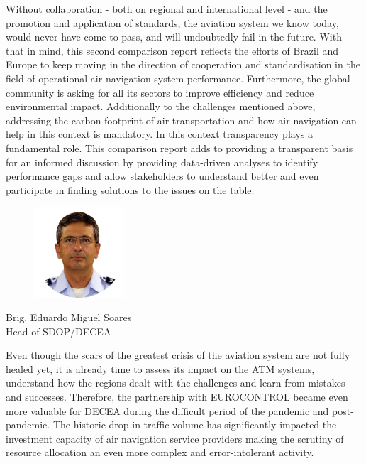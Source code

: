 \documentclass[
  a4paper,
  DIV=11,
  numbers=noendperiod]{scrreprt}
\begin{document}
Without collaboration - both on regional and international level - and
the promotion and application of standards, the aviation system we know
today, would never have come to pass, and will undoubtedly fail in the
future. With that in mind, this second comparison report reflects the
efforts of Brazil and Europe to keep moving in the direction of
cooperation and standardisation in the field of operational air
navigation system performance. Furthermore, the global community is
asking for all its sectors to improve efficiency and reduce
environmental impact. Additionally to the challenges mentioned above,
addressing the carbon footprint of air transportation and how air
navigation can help in this context is mandatory. In this context
transparency plays a fundamental role. This comparison report adds to
providing a transparent basis for an informed discussion by providing
data-driven analyses to identify performance gaps and allow stakeholders
to understand better and even participate in finding solutions to the
issues on the table.

\begin{figure}[h]

{\centering \includegraphics[width=0.3\textwidth,height=\textheight]{././figures/Brig_Ar_Miguel-cropped.png}

}

\end{figure}

Brig. Eduardo Miguel Soares\\
Head of SDOP/DECEA

Even though the scars of the greatest crisis of the aviation system are
not fully healed yet, it is already time to assess its impact on the ATM
systems, understand how the regions dealt with the challenges and learn
from mistakes and successes. Therefore, the partnership with EUROCONTROL
became even more valuable for DECEA during the difficult period of the
pandemic and post-pandemic. The historic drop in traffic volume has
significantly impacted the investment capacity of air navigation service
providers making the scrutiny of resource allocation an even more
complex and error-intolerant activity.
\end{document}
